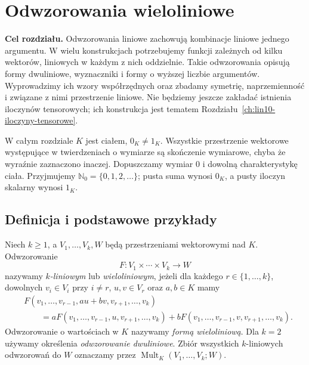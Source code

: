 \chapter{Odwzorowania wieloliniowe}
\label{ch:lin8-wieloliniowe}

\noindent\textbf{Cel rozdziału.}
Odwzorowania liniowe zachowują kombinacje liniowe
jednego argumentu. W wielu konstrukcjach potrzebujemy
funkcji zależnych od kilku wektorów, liniowych
w każdym z nich oddzielnie. Takie odwzorowania
opisują formy dwuliniowe, wyznaczniki i formy
o wyższej liczbie argumentów.
Wyprowadzimy ich wzory współrzędnych oraz zbadamy
symetrię, naprzemienność i związane z nimi
przestrzenie liniowe. Nie będziemy jeszcze
zakładać istnienia iloczynów tensorowych;
ich konstrukcja jest tematem Rozdziału~\ref{ch:lin10-iloczyny-tensorowe}.

W całym rozdziale \(K\) jest ciałem,
\(0_K\ne1_K\). Wszystkie przestrzenie
wektorowe występujące w twierdzeniach
o wymiarze są skończenie wymiarowe,
chyba że wyraźnie zaznaczono inaczej.
Dopuszczamy wymiar \(0\) i dowolną
charakterystykę ciała.
Przyjmujemy \(\mathbb N_0=\{0,1,2,\ldots\}\);
pusta suma wynosi \(0_K\), a pusty iloczyn
skalarny wynosi \(1_K\).

\section{Definicja i podstawowe przykłady}
\label{sec:lin8-definicja}

\begin{definicja}
\label{def:lin8-wieloliniowe}
Niech \(k\geq1\), a \(V_1,\ldots,V_k,W\)
będą przestrzeniami wektorowymi nad \(K\).
Odwzorowanie
\[
 F\colon V_1\times\cdots\times V_k\longrightarrow W
\]
nazywamy \emph{\(k\)-liniowym} lub
\emph{wieloliniowym}, jeżeli dla każdego
\(r\in\{1,\ldots,k\}\), dowolnych
\(v_i\in V_i\) przy \(i\ne r\),
\(u,v\in V_r\) oraz \(a,b\in K\) mamy
\[
 \begin{aligned}
 &F(v_1,\ldots,v_{r-1},au+bv,
                  v_{r+1},\ldots,v_k)\\
 &\qquad =
 aF(v_1,\ldots,v_{r-1},u,v_{r+1},\ldots,v_k)
 +bF(v_1,\ldots,v_{r-1},v,v_{r+1},\ldots,v_k).
 \end{aligned}
\]
Odwzorowanie o wartościach w \(K\)
nazywamy \emph{formą wieloliniową}.
Dla \(k=2\) używamy określenia
\emph{odwzorowanie dwuliniowe}.
Zbiór wszystkich \(k\)-liniowych
odwzorowań do \(W\) oznaczamy
przez \(\operatorname{Mult}_K(V_1,\ldots,V_k;W)\).
\end{definicja}

